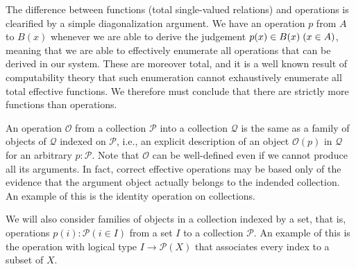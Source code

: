 The difference between functions (total single-valued relations) and operations
is clearified by a simple diagonalization argument. We have an operation $p$
from $A$ to $B(x)$ whenever we are able to derive the judgement
$p(x) \in B(x) \; (x \in A)$, meaning that we are able to effectively enumerate
all operations that can be derived in our system. These are moreover total, and
it is a well known result of computability theory that such enumeration cannot
exhaustively enumerate all total effective functions. We therefore must conclude
that there are strictly more functions than operations.

An operation $\mathcal{O}$ from a collection $\mathcal{P}$ into a collection
$\mathcal{Q}$ is the same as a family of objects of $\mathcal{Q}$ indexed on
$\mathcal{P}$, i.e., an explicit description of an object $\mathcal{O}(p)$ in
$\mathcal{Q}$ for an arbitrary $p : \mathcal{P}$. Note that $\mathcal{O}$ can be
well-defined even if we cannot produce all its arguments. In fact, correct
effective operations may be based only of the evidence that the argument object
actually belongs to the indended collection. An example of this is the identity
operation on collections.

We will also consider families of objects in a collection indexed by a set, that
is, operations $p(i) : \mathcal{P} (i \in I)$ from a set $I$ to a collection
$\mathcal{P}$. An example of this is the operation with logical type $I
\rightarrow \mathcal{P}(X)$ that associates every index to a subset of $X$.

